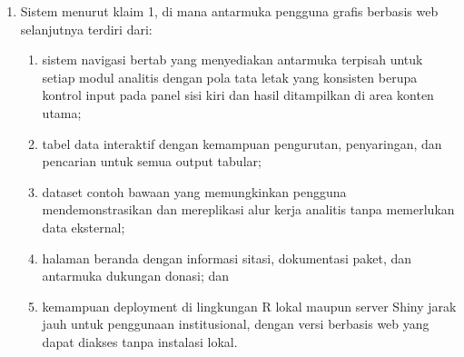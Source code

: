 \documentclass[12pt,a4paper]{article}
\begin{document}
\begin{enumerate}[leftmargin=3em, labelsep=1em, itemsep=12pt]
\item Sistem menurut klaim 1, di mana antarmuka pengguna grafis berbasis web selanjutnya terdiri dari:
\begin{enumerate}[label=\alph*., leftmargin=2em, itemsep=2pt]
\item sistem navigasi bertab yang menyediakan antarmuka terpisah untuk setiap modul analitis dengan pola tata letak yang konsisten berupa kontrol input pada panel sisi kiri dan hasil ditampilkan di area konten utama;
\item tabel data interaktif dengan kemampuan pengurutan, penyaringan, dan pencarian untuk semua output tabular;
\item dataset contoh bawaan yang memungkinkan pengguna mendemonstrasikan dan mereplikasi alur kerja analitis tanpa memerlukan data eksternal;
\item halaman beranda dengan informasi sitasi, dokumentasi paket, dan antarmuka dukungan donasi; dan
\item kemampuan deployment di lingkungan R lokal maupun server Shiny jarak jauh untuk penggunaan institusional, dengan versi berbasis web yang dapat diakses tanpa instalasi lokal.
\end{enumerate}


\end{enumerate}
\end{document}
